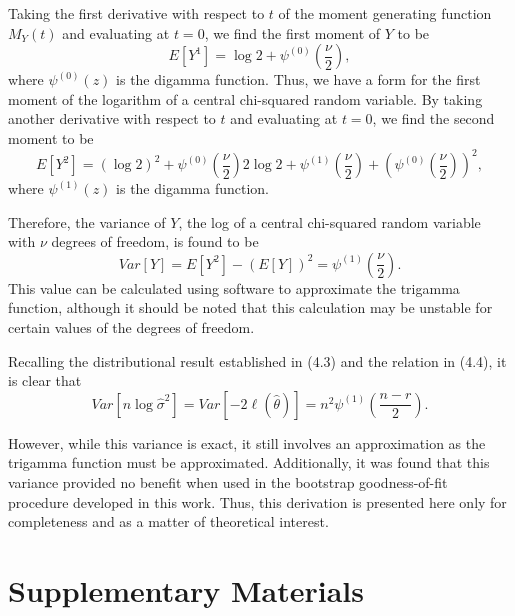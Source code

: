 \documentclass[12pt]{article} %
\theoremstyle{definition}
\begin{document}
Taking the first derivative with respect to $t$ of the moment generating function $M_Y (t)$ and evaluating at $t=0$, we find the first moment of $Y$ to be
\begin{equation*}
	E \left[ Y^1 \right] =  \log 2 + \psi^{(0)} \left( \frac{\nu}{2} \right) ,
\end{equation*}
where $\psi^{(0)}(z)$ is the digamma function. Thus, we have a form for the first moment of the logarithm of a central chi-squared random variable. By taking another
derivative with respect to $t$ and evaluating at $t=0$, we find the second moment to be
\begin{equation*}
	E \left[ Y^2 \right] =
	(\log 2)^2 + \psi^{(0)} \left( \frac{\nu}{2} \right) 2 \log 2  + \psi^{(1)} \left( \frac{\nu}{2} \right) + \left( \psi^{(0)} \left( \frac{\nu}{2} \right) \right)^2 ,
\end{equation*}
where $\psi^{(1)}(z)$ is the digamma function.

Therefore, the variance of $Y$, the log of a central chi-squared random variable with
$\nu$ degrees of freedom, is found to be
\begin{equation*}
	Var \left[ Y \right] = E \left[ Y^2 \right] - \left( E \left[ Y \right] \right)^2 = \psi^{(1)} \left( \frac{\nu}{2} \right) .
\end{equation*}
This value can be calculated using software to approximate the trigamma function, although it should be noted that this calculation may be unstable for certain values of the degrees of freedom.

Recalling the distributional result established in (4.3) and the relation in (4.4), it is clear that
\begin{equation*}
	Var \left[ n \log \hat{\sigma}^2 \right] = Var \left[ -2 \ell (\hat{\theta} ) \right] = n^2 \psi^{(1)} \left( \frac{n-r}{2} \right).
\end{equation*}

However, while this variance is exact, it still involves an approximation as the trigamma function must be approximated. Additionally, it was found that
this variance provided no benefit when used in the bootstrap goodness-of-fit procedure developed in this work. Thus, this derivation is presented here only
for completeness and as a matter of theoretical interest.

\section*{Supplementary Materials}
\end{document}
